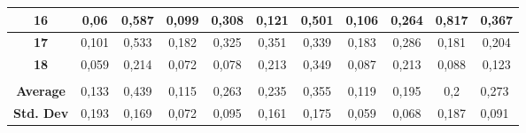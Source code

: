 \begin{table}[]
{\begin{tabular}{ccccccccccc}
\multicolumn{1}{|c|}{\textbf{16}}       & \multicolumn{1}{c|}{0,06}              & \multicolumn{1}{c|}{0,587}          & \multicolumn{1}{c|}{0,099}             & \multicolumn{1}{c|}{0,308}          & \multicolumn{1}{c|}{0,121}             & \multicolumn{1}{c|}{0,501}          & \multicolumn{1}{c|}{0,106}             & \multicolumn{1}{c|}{0,264}          & \multicolumn{1}{c|}{0,817}             & \multicolumn{1}{c|}{0,367}          \\ \hline
\multicolumn{1}{|c|}{\textbf{17}}       & \multicolumn{1}{c|}{0,101}             & \multicolumn{1}{c|}{0,533}          & \multicolumn{1}{c|}{0,182}             & \multicolumn{1}{c|}{0,325}          & \multicolumn{1}{c|}{0,351}             & \multicolumn{1}{c|}{0,339}          & \multicolumn{1}{c|}{0,183}             & \multicolumn{1}{c|}{0,286}          & \multicolumn{1}{c|}{0,181}             & \multicolumn{1}{c|}{0,204}          \\ \hline
\multicolumn{1}{|c|}{\textbf{18}}       & \multicolumn{1}{c|}{0,059}             & \multicolumn{1}{c|}{0,214}          & \multicolumn{1}{c|}{0,072}             & \multicolumn{1}{c|}{0,078}          & \multicolumn{1}{c|}{0,213}             & \multicolumn{1}{c|}{0,349}          & \multicolumn{1}{c|}{0,087}             & \multicolumn{1}{c|}{0,213}          & \multicolumn{1}{c|}{0,088}             & \multicolumn{1}{c|}{0,123}          \\ \hline
\multicolumn{1}{l}{}                    & \multicolumn{1}{l}{}                   & \multicolumn{1}{l}{}                & \multicolumn{1}{l}{}                   & \multicolumn{1}{l}{}                & \multicolumn{1}{l}{}                   & \multicolumn{1}{l}{}                & \multicolumn{1}{l}{}                   & \multicolumn{1}{l}{}                & \multicolumn{1}{l}{}                   & \multicolumn{1}{l}{}                \\ \hline
\multicolumn{1}{|c|}{\textbf{Average}}  & \multicolumn{1}{c|}{0,133}             & \multicolumn{1}{c|}{0,439}          & \multicolumn{1}{c|}{0,115}             & \multicolumn{1}{c|}{0,263}          & \multicolumn{1}{c|}{0,235}             & \multicolumn{1}{c|}{0,355}          & \multicolumn{1}{c|}{0,119}             & \multicolumn{1}{c|}{0,195}          & \multicolumn{1}{c|}{0,2}               & \multicolumn{1}{l|}{0,273}          \\ \hline
\multicolumn{1}{|c|}{\textbf{Std. Dev}} & \multicolumn{1}{c|}{0,193}             & \multicolumn{1}{c|}{0,169}          & \multicolumn{1}{c|}{0,072}             & \multicolumn{1}{c|}{0,095}          & \multicolumn{1}{c|}{0,161}             & \multicolumn{1}{c|}{0,175}          & \multicolumn{1}{c|}{0,059}             & \multicolumn{1}{c|}{0,068}          & \multicolumn{1}{c|}{0,187}             & \multicolumn{1}{l|}{0,091}          \\ \hline

\end{tabular}}
\end{table}
